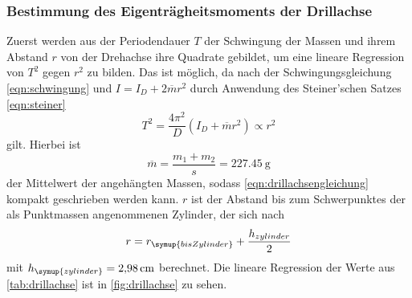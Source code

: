 \subsubsection{Bestimmung des Eigenträgheitsmoments der Drillachse}
Zuerst werden aus der Periodendauer $T$ der Schwingung der Massen und ihrem
Abstand $r$ von der Drehachse ihre Quadrate gebildet, um eine lineare Regression
von $T^2$ gegen $r^2$ zu bilden. Das ist möglich, da nach der Schwingungsgleichung
\eqref{eqn:schwingung} und $I=I_D+2\overline{m}r^2$ durch Anwendung des
Steiner'schen Satzes \eqref{eqn:steiner}
\begin{equation}
  T^2 = \frac{4\pi^2}{D}(I_D+\overline{m}r^2)\propto r^2
  \label{eqn:drillachsengleichung}
\end{equation}
gilt. Hierbei ist
\begin{equation}
  \overline{m} = \frac{m_1+m_2}{s} =\SI{227.45}{\gram}
\end{equation}
der Mittelwert der angehängten Massen, sodass \eqref{eqn:drillachsengleichung}
kompakt geschrieben werden kann. $r$ ist der Abstand bis zum Schwerpunktes der
als Punktmassen angenommenen Zylinder, der sich nach
\begin{equation}
  r = r_{\symup{bis Zylinder}}
      +\frac{h_{zylinder}}{2}
\end{equation}
mit $h_{\symup{zylinder}} = \SI{2.98}{cm}$ berechnet.
Die lineare Regression der Werte aus \ref{tab:drillachse} ist in
\ref{fig:drillachse} zu sehen.

